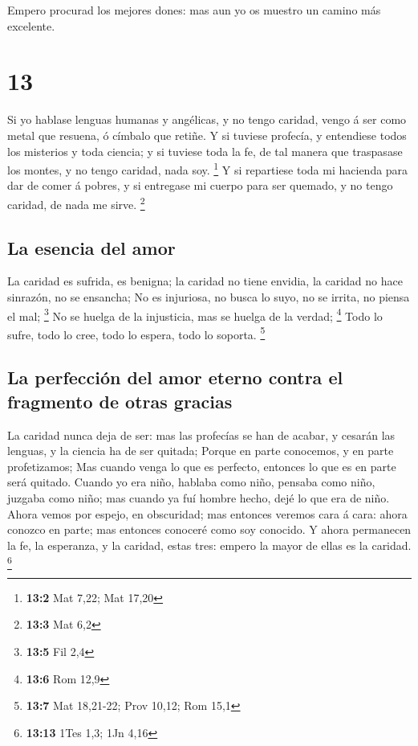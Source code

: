  Empero procurad los mejores dones: mas aun yo os muestro
un camino más excelente.

\hypertarget{section-12}{%
\section{13}\label{section-12}}

 Si yo hablase lenguas humanas y angélicas, y no tengo
caridad, vengo á ser como metal que resuena, ó címbalo que retiñe.
 Y si tuviese profecía, y entendiese todos los misterios y
toda ciencia; y si tuviese toda la fe, de tal manera que traspasase los
montes, y no tengo caridad, nada soy. \footnote{\textbf{13:2} Mat 7,22;
  Mat 17,20}  Y si repartiese toda mi hacienda para dar de
comer á pobres, y si entregase mi cuerpo para ser quemado, y no tengo
caridad, de nada me sirve. \footnote{\textbf{13:3} Mat 6,2}

\hypertarget{la-esencia-del-amor}{%
\subsection{La esencia del amor}\label{la-esencia-del-amor}}

 La caridad es sufrida, es benigna; la caridad no tiene
envidia, la caridad no hace sinrazón, no se ensancha;  No
es injuriosa, no busca lo suyo, no se irrita, no piensa el mal;
\footnote{\textbf{13:5} Fil 2,4}  No se huelga de la
injusticia, mas se huelga de la verdad; \footnote{\textbf{13:6} Rom 12,9}
 Todo lo sufre, todo lo cree, todo lo espera, todo lo
soporta. \footnote{\textbf{13:7} Mat 18,21-22; Prov 10,12; Rom 15,1}

\hypertarget{la-perfecciuxf3n-del-amor-eterno-contra-el-fragmento-de-otras-gracias}{%
\subsection{La perfección del amor eterno contra el fragmento de otras
gracias}\label{la-perfecciuxf3n-del-amor-eterno-contra-el-fragmento-de-otras-gracias}}

 La caridad nunca deja de ser: mas las profecías se han de
acabar, y cesarán las lenguas, y la ciencia ha de ser quitada;
 Porque en parte conocemos, y en parte profetizamos;
 Mas cuando venga lo que es perfecto, entonces lo que es
en parte será quitado.  Cuando yo era niño, hablaba como
niño, pensaba como niño, juzgaba como niño; mas cuando ya fuí hombre
hecho, dejé lo que era de niño.  Ahora vemos por espejo,
en obscuridad; mas entonces veremos cara á cara: ahora conozco en parte;
mas entonces conoceré como soy conocido.  Y ahora
permanecen la fe, la esperanza, y la caridad, estas tres: empero la
mayor de ellas es la caridad. \footnote{\textbf{13:13} 1Tes 1,3; 1Jn
  4,16}

